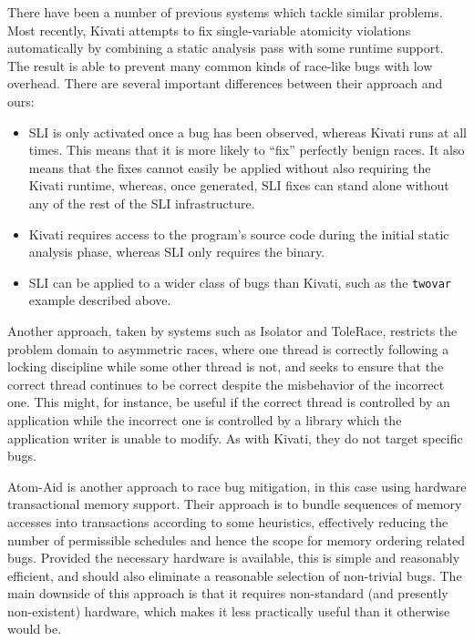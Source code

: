 \documentclass[10pt,twocolumn,preprint,natbib,authoryear]{sigplanconf}
\begin{document}
There have been a number of previous systems which tackle similar
problems.  Most recently, Kivati\cite{Chew2010a} attempts to fix
single-variable atomicity violations automatically by combining a
static analysis pass with some runtime support.  The result is able to
prevent many common kinds of race-like bugs with low overhead.  There
are several important differences between their approach and ours:

\begin{itemize}
\item SLI is only activated once a bug has been observed, whereas
  Kivati runs at all times.  This means that it is more likely to
  ``fix'' perfectly benign races.  It also means that the fixes cannot
  easily be applied without also requiring the Kivati runtime,
  whereas, once generated, SLI fixes can stand alone without any of
  the rest of the SLI infrastructure.
\item Kivati requires access to the program's source code during the
  initial static analysis phase, whereas SLI only requires the binary.
\item SLI can be applied to a wider class of bugs than Kivati, such as
  the \verb|twovar| example described above.
\end{itemize}

Another approach, taken by systems such as
Isolator \cite{Ramalingam2009} and ToleRace\cite{Ratanaworabhan2008},
restricts the problem domain to asymmetric races, where one thread is
correctly following a locking discipline while some other thread is
not, and seeks to ensure that the correct thread continues to be
correct despite the misbehavior of the incorrect one.  This might,
for instance, be useful if the correct thread is controlled by an
application while the incorrect one is controlled by a library which
the application writer is unable to modify.  As with Kivati, they do
not target specific bugs.

Atom-Aid\cite{Lucia2009} is another approach to race bug
mitigation, in this case using hardware transactional memory support.
Their approach is to bundle sequences of memory accesses into
transactions according to some heuristics, effectively reducing the
number of permissible schedules and hence the scope for memory
ordering related bugs.  Provided the necessary hardware is available,
this is simple and reasonably efficient, and should also eliminate a
reasonable selection of non-trivial bugs.  The main downside of this
approach is that it requires non-standard (and presently non-existent)
hardware, which makes it less practically useful than it otherwise
would be.
\end{document}
